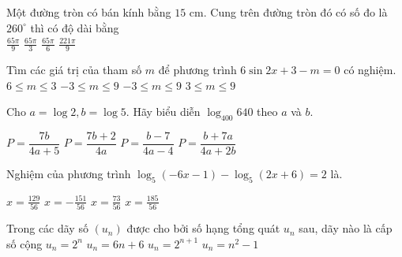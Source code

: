 \documentclass[12pt,a4paper]{article}
\begin{document}
\begin{ex}
 Một đường tròn có bán kính bằng ${15}$ cm. Cung trên đường tròn đó có số đo là ${260}^\circ$ thì có độ dài bằng\\ 
\choice
{ $\frac{65 \pi}{9}$ }
   { \True $\frac{65 \pi}{3}$ }
     { $\frac{65 \pi}{6}$ }
    { $\frac{221 \pi}{9}$ }
\end{ex}

\begin{ex}
 Tìm các giá trị của tham số $m$ để phương trình $6 \sin{2 x }+3 - m=0$ có nghiệm.
\choice
{ $6 \le m \le 3$ }
   { \True $-3 \le m \le 9$ }
     { $-3 \le m \le 9$ }
    { $3 \le m \le 9$ }
\end{ex}

\begin{ex}
 Cho $a=\log 2, b=\log 5$. Hãy biểu diễn $\log_{400}{640}$ theo $a$ và $b$.
 
\choice
{ $P={\dfrac{7b}{4a +5}}$ }
   { $P={\dfrac{7b +2}{4a}}$ }
     { $P={\dfrac{b -7}{4a - 4}}$ }
    { \True $P={\dfrac{b + 7a}{4a +2b}}$ }
\end{ex}

\begin{ex}
 Nghiệm của phương trình $\log_5(- 6 x - 1) - \log_5(2 x + 6)=2$ là.
 
\choice
{ ${x=\frac{129}{56}}$ }
   { \True ${x=- \frac{151}{56}}$ }
     { ${x=\frac{73}{56}}$ }
    { ${x=\frac{185}{56}}$ }
\end{ex}

\begin{ex}
 Trong các dãy số $(u_n)$ được cho bởi số hạng tổng quát $u_n$ sau, dãy nào là cấp số cộng 
\choice
{ $u_n=2^n$ }
   { \True $u_n=6 n + 6$ }
     { $u_n=2^{n+1}$ }
    { $u_n=n^{2} - 1$ }
\end{ex}
\end{document}
